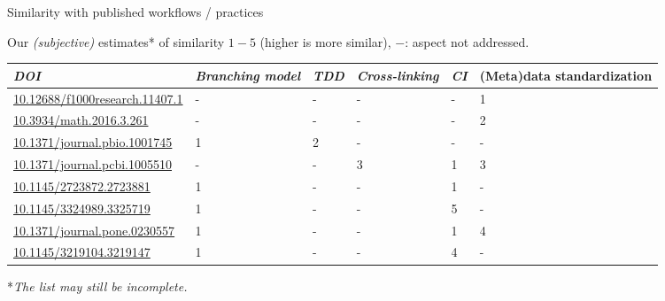 \documentclass[
	ngerman,%
	aspectratio=169,%
	color={accentcolor=2d},
	logo=true,%
	colorframetitle=true,%
	]{tudabeamer}
\begin{document}
\begin{frame}{Similarity with published workflows / practices}

	\vfill
	Our \emph{(subjective)} estimates* of similarity $1-5$ (higher is more similar), $-$: aspect not addressed.
	\begin{center}
		\scriptsize
		\begin{tabular}{@{} *6l @{}}    \toprule
				\emph{DOI} & \emph{Branching model} & \emph{TDD} & \emph{Cross-linking} & \emph{CI}  & (Meta)data standardization \\\midrule
				 \href{https://doi.org/10.12688/f1000research.11407.1}{10.12688/f1000research.11407.1} 
					 & -  & -  & -  & - & 1  \\ 
				 \href{https://doi.org/10.3934/math.2016.3.261}{10.3934/math.2016.3.261} 
					 & -  & -  & -  & - & 2  \\ 
				 \href{https://doi.org/10.1371/journal.pbio.1001745}{10.1371/journal.pbio.1001745} 
					 & 1  & 2  & -  & - & -  \\ 
				 \href{https://doi.org/10.1371/journal.pcbi.1005510}{10.1371/journal.pcbi.1005510}
					 & -  & -  & 3 & 1 & 3  \\ 
				 \href{https://doi.org/10.1145/2723872.2723881}{10.1145/2723872.2723881}
					 & 1  & -  & - & 1 & -  \\ 
				 \href{https://dl.acm.org/doi/10.1145/3324989.3325719}{10.1145/3324989.3325719}
					 & 1  & -  & - & 5 & -  \\ 
				 \href{https://doi.org/10.1371/journal.pone.0230557}{10.1371/journal.pone.0230557}
					 & 1  & -  & - & 1 & 4  \\ 
				 \href{https://doi.org/10.1145/3219104.3219147}{10.1145/3219104.3219147} 
					 & 1  & -  & -  & 4 & - \\\bottomrule
				 \hline
		\end{tabular}
	\end{center}
	
	*\emph{The list may still be incomplete.}
	
\end{frame}
\end{document}
